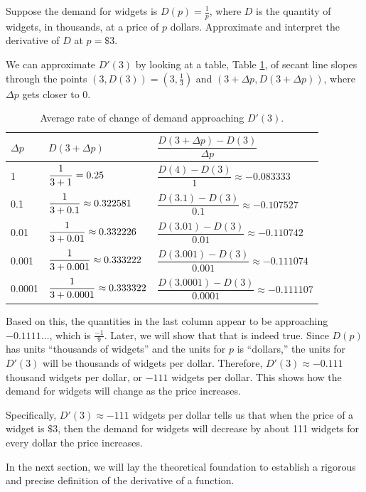 \begin{example}
Suppose the demand for widgets is $D(p)=\frac{1}{p}$, where $D$ is the quantity of widgets, in thousands, at a price of $p$ dollars. Approximate and interpret the derivative of $D$ at $p=\$3$.

\begin{solution} We can approximate $D'(3)$ by looking at a table, Table \ref{tab:2-3-Dprime}, of secant line slopes through the points $(3, D(3)) = \left(3, \frac{1}{3}\right)$ and $(3+\Delta p, D(3+\Delta p))$, where $\Delta p$ gets closer to $0$.

\begin{table}[ht!]
\begin{centering}
\begin{tabular}{lll}
\toprule
$\Delta p$ & $D(3+\Delta p)$ & $\dfrac{D(3+\Delta p)-D(3)}{\Delta p}$ \\
\midrule
1        & $\dfrac{1\mathstrut}{3+1\mathstrut} = 0.25$                & $\dfrac{D(4)     -D(3)}{1}     \approx -0.083333$ \\
0.1      & $\dfrac{1\mathstrut}{3+0.1\mathstrut} \approx 0.322581$    & $\dfrac{D(3.1)   -D(3)}{0.1}   \approx -0.107527$ \\
0.01     & $\dfrac{1\mathstrut}{3+0.01\mathstrut} \approx 0.332226$   & $\dfrac{D(3.01)  -D(3)}{0.01}  \approx -0.110742$ \\
0.001    & $\dfrac{1\mathstrut}{3+0.001\mathstrut} \approx 0.333222$  & $\dfrac{D(3.001) -D(3)}{0.001} \approx -0.111074$ \\
0.0001   & $\dfrac{1\mathstrut}{3+0.0001\mathstrut} \approx 0.333322$ & $\dfrac{D(3.0001)-D(3)}{0.0001}\approx -0.111107$ \\
\bottomrule
\end{tabular}
\caption{Average rate of change of demand approaching $D'(3)$.}
\label{tab:2-3-Dprime}
\end{centering}
\end{table}
Based on this, the quantities in the last column appear to be approaching $-0.1111\ldots$, which is $\frac{-1}{9}$. Later, we will show that that is indeed true. Since $D(p)$ has units ``thousands of widgets'' and the units for $p$ is ``dollars,'' the units for $D'(3)$ will be thousands of widgets per dollar. Therefore, $D'(3) \approx -0.111$ thousand widgets per dollar, or $-111$ widgets per dollar. This shows how the demand for widgets will change as the price increases.

Specifically, $D'(3)\approx -111$ widgets per dollar tells us that when the price of a widget is $\$3$, then the demand for widgets will decrease by about 111 widgets for every dollar the price increases.
\end{solution}\end{example} 

In the next section, we will lay the theoretical foundation to establish a rigorous and precise definition of the derivative of a function.


